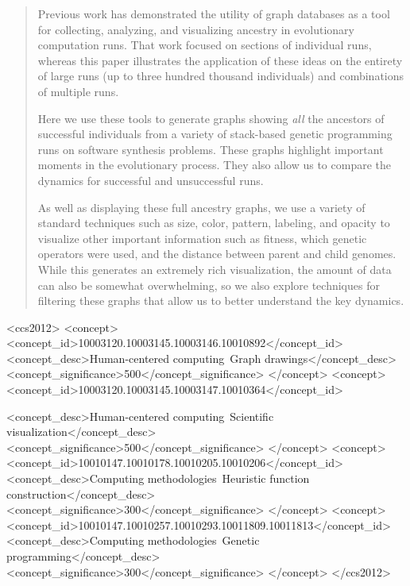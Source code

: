 \documentclass{sig-alternate}
\begin{document}
\begin{abstract}

Previous work has demonstrated the utility of graph databases as a tool 
for collecting, analyzing, and visualizing ancestry in evolutionary computation runs. 
That work focused on sections of individual runs, whereas this paper 
illustrates the application of these ideas on the entirety of large runs 
(up to three hundred thousand individuals) and combinations of multiple runs.

Here we use these tools to generate graphs showing \emph{all} the 
ancestors of successful individuals from a variety of stack-based 
genetic programming runs on software synthesis problems. These graphs 
highlight important moments in the evolutionary process. They also 
allow us to compare the dynamics for successful and unsuccessful runs.

As well as displaying these full ancestry graphs, we use a
variety of standard techniques such as size, color, pattern,
labeling, and opacity to visualize other important information such as fitness, 
which genetic operators were used, and the distance between parent and
child genomes. While this generates an extremely rich visualization,
the amount of data can also be somewhat overwhelming, so we also
explore techniques for filtering these graphs that allow us to better
understand the key dynamics.

\end{abstract}

\begin{CCSXML}
	<ccs2012>
	<concept>
	<concept_id>10003120.10003145.10003146.10010892</concept_id>
	<concept_desc>Human-centered computing~Graph drawings</concept_desc>
	<concept_significance>500</concept_significance>
	</concept>
	<concept>
	<concept_id>10003120.10003145.10003147.10010364</concept_id>

	<concept_desc>Human-centered computing~Scientific visualization</concept_desc>
	<concept_significance>500</concept_significance>
	</concept>
	<concept>
	<concept_id>10010147.10010178.10010205.10010206</concept_id>
	<concept_desc>Computing methodologies~Heuristic function construction</concept_desc>
	<concept_significance>300</concept_significance>
	</concept>
	<concept>
	<concept_id>10010147.10010257.10010293.10011809.10011813</concept_id>
	<concept_desc>Computing methodologies~Genetic programming</concept_desc>
	<concept_significance>300</concept_significance>
	</concept>
	</ccs2012>
\end{CCSXML}
\end{document}
